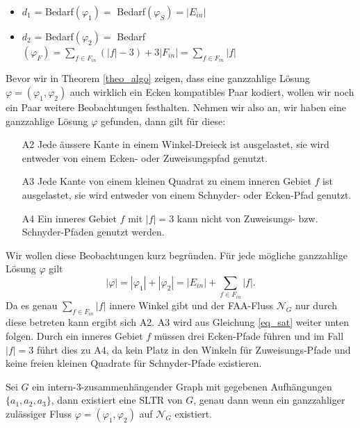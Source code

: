 \begin{itemize}
\item $d_1$ = Bedarf$(\varphi_1) = $ Bedarf$(\varphi_S) = |E_{in}|$
\item $d_2$ = Bedarf$(\varphi_2) = $ Bedarf$(\varphi_F) =  \sum_{f \in F_{in}}(|f|-3) + 3|F_{in}| = \sum_{f \in F_{in}} |f|$
\end{itemize}

Bevor wir in Theorem \ref{theo_algo} zeigen, dass eine ganzzahlige Lösung $\varphi=(\varphi_1,\varphi_2)$ auch wirklich ein Ecken kompatibles Paar kodiert, wollen wir noch ein Paar weitere Beobachtungen festhalten. Nehmen wir also an, wir haben eine ganzzahlige Lösung $\varphi$ gefunden, dann gilt für diese:
\begin{itemize}
\item [A2] Jede äussere Kante in einem Winkel-Dreieck ist ausgelastet, sie wird entweder von einem Ecken- oder Zuweisungspfad genutzt.
\item [A3] Jede Kante von einem kleinen Quadrat zu einem inneren Gebiet $f$ ist ausgelastet, sie wird entweder von einem Schnyder- oder Ecken-Pfad genutzt.
\item [A4] Ein inneres Gebiet $f$ mit $|f|=3$ kann nicht von Zuweisungs- bzw. Schnyder-Pfaden genutzt werden.
\end{itemize}

Wir wollen diese Beobachtungen kurz begründen. Für jede mögliche ganzzahlige Lösung $\varphi$ gilt $$|\varphi|=|\varphi_1|+|\varphi_2| = |E_{in}| + \sum_{f \in F_{in}} |f|.$$
Da es genau $\sum_{f \in F_{in}} |f|$ innere Winkel gibt und der FAA-Fluss $\mathcal{N}_G$ nur durch diese betreten kann ergibt sich A2. A3 wird aus Gleichung \ref{eq_sat} weiter unten folgen. Durch ein inneres Gebiet $f$ müssen drei Ecken-Pfade führen und im Fall $|f|=3$ führt dies zu A4, da kein Platz in den Winkeln für Zuweisungs-Pfade und keine freien kleinen Quadrate für Schnyder-Pfade existieren.

\begin{theorem}\label{theo_algo}
Sei $G$ ein intern-3-zusammenhängender Graph mit gegebenen Aufhängungen $\{a_1,a_2,a_3\}$, dann existiert eine SLTR von $G$, genau dann wenn ein ganzzahliger zulässiger Fluss $\varphi=(\varphi_1,\varphi_2)$ auf $\mathcal{N}_G$ existiert.
\end{theorem}

